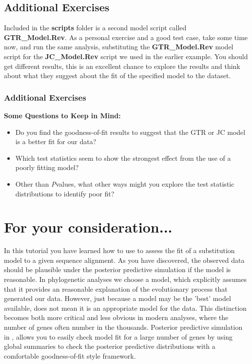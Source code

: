 \subsection{Additional Exercises}

Included in the \textbf{scripts} folder is a second model script called \textbf{GTR\_Model.Rev}. 
As a personal exercise and a good test case, take some time now, and run the same analysis, substituting
the \textbf{GTR\_Model.Rev} model script for the \textbf{JC\_Model.Rev} script we used in the earlier example.
You should get different results, this is an excellent chance to explore the results and think about what
they suggest about the fit of the specified model to the dataset. 

\subsubsection{Additional Exercises}
\textbf{Some Questions to Keep in Mind:}
\begin{itemize}
  \item Do you find the goodness-of-fit results to suggest that the GTR or JC model is a better fit for our data? 
  \item Which test statistics seem to show the strongest effect from the use of a poorly fitting model?
  \item Other than \textit{P}\-values, what other ways might you explore the test statistic distributions to identify poor fit?
\end{itemize}


\newpage
\section{For your consideration...}
In this tutorial you have learned how to use \RevBayes to assess the fit of a substitution model 
to a given sequence alignment. As you have discovered, the observed data should be plausible under 
the posterior predictive simulation if the model is reasonable. In phylogenetic analyses we choose a model, which explicitly assumes 
that it provides an reasonable explanation of the evolutionary process that generated our data. However, 
just because a model may be the 'best' model available, does not mean it is an appropriate model for the data. 
This distinction becomes both more critical and less obvious in modern analyses, where the 
number of genes often number in the thousands. Posterior predictive simulation in \RevBayes, allows you
to easily check model fit for a large number of genes by using global summaries to check the posterior 
predictive distributions with a comfortable goodness-of-fit style framework. 

